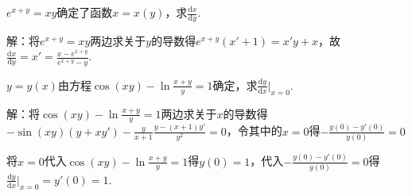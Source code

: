 \documentclass[12pt,UTF8]{ctexart}
\begin{document}
\begin{enumerate}
$e^{x+y}=xy$确定了函数$x=x(y)$，求$\frac{\mathrm dx}{\mathrm dy}$.

解：将$e^{x+y}=xy$两边求关于$y$的导数得$e^{x+y}(x'+1)=x'y+x$，故$\frac{\mathrm dx}{\mathrm dy}=x'=\frac{x-e^{x+y}}{e^{x+y}-y}$.

$y=y(x)$由方程$\cos(xy)-\ln\frac{x+y}y=1$确定，求$\frac{\mathrm dy}{\mathrm dx}|_{x=0}$.

解：将$\cos(xy)-\ln\frac{x+y}y=1$两边求关于$x$的导数得$-\sin(xy)(y+xy')-\frac y{x+1}\frac{y-(x+1)y'}{y^2}=0$，令其中的$x=0$得$-\frac{y(0)-y'(0)}{y(0)}=0$

将$x=0$代入$\cos(xy)-\ln\frac{x+y}y=1$得$y(0)=1$，代入$-\frac{y(0)-y'(0)}{y(0)}=0$得$\frac{\mathrm dy}{\mathrm dx}|_{x=0}=y'(0)=1$.
\end{enumerate}
\end{document}
